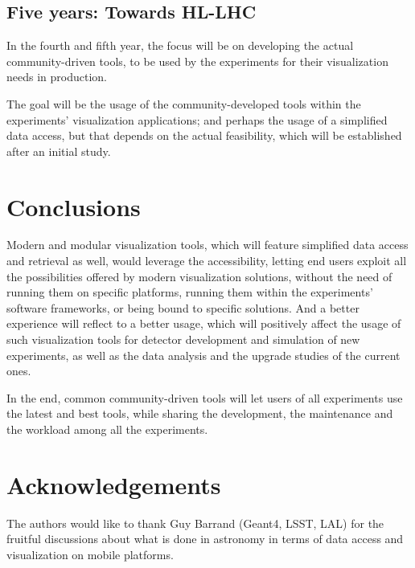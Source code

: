 \documentclass[12pt,a4paper]{article}
\begin{document}
\hypertarget{five-year}{%
\subsection{Five years: Towards HL-LHC}\label{five-year}}

In the fourth and fifth year, the focus will be on developing the actual community-driven tools, to be used by the experiments
for their visualization needs in production.

The goal will be the usage of the community-developed tools within the experiments’ visualization applications; and
perhaps the usage of a simplified data access, but that depends on the actual feasibility, which will be established
after an initial study.

\hypertarget{conclusions}{%
\section{Conclusions}\label{conclusions}}

Modern and modular visualization tools, which will feature simplified data access and retrieval as well, would leverage
the accessibility, letting end users exploit all the possibilities offered by modern visualization solutions, without the need
of running them on specific platforms, running them within the experiments’ software frameworks, or being bound to specific solutions.
And a better experience will reflect to a better usage, which will positively affect the usage of such visualization tools for
detector development and simulation of new experiments, as well as the data analysis and the upgrade studies of the current ones.

In the end, common community-driven tools will let users of all experiments use the latest and best tools, while sharing the development,
the maintenance and the workload among all the experiments.

\hypertarget{acknowledgements}{%
\section{Acknowledgements}\label{acknowledgements}}

The authors would like to thank Guy Barrand (Geant4, LSST, LAL) for the fruitful discussions about what is done in astronomy in terms of data access and visualization on mobile platforms.




\sloppy
\raggedright
\clearpage
\printbibliography[title={References},heading=bibintoc]
\end{document}
